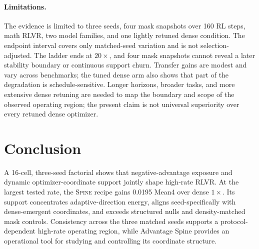 \documentclass[5p,times]{elsarticle}
\newcommand{\recipe}{\textsc{Spine}}
\begin{document}
\paragraph{Limitations.}
The evidence is limited to three seeds, four mask snapshots over 160 RL steps,
math RLVR, two model families, and one lightly retuned dense condition. The
endpoint interval covers only matched-seed variation and is not
selection-adjusted. The ladder ends at $20\times$, and four mask snapshots
cannot reveal a later stability boundary or continuous
support churn. Transfer gains are modest and vary across benchmarks; the tuned
dense arm also shows that part of the degradation is schedule-sensitive.
Longer horizons, broader tasks, and more extensive dense retuning are needed to
map the boundary and scope of the observed operating region; the present claim
is not universal superiority over every retuned dense optimizer.

\section{Conclusion}
A 16-cell, three-seed factorial shows that negative-advantage exposure and
dynamic optimizer-coordinate support jointly shape high-rate RLVR. At the
largest tested rate, the \recipe{} recipe gains 0.0195 Mean4 over dense
$1\times$. Its support concentrates adaptive-direction energy, aligns
seed-specifically with dense-emergent coordinates, and exceeds structured
nulls and density-matched mask controls. Consistency across the three matched
seeds supports a protocol-dependent high-rate operating region, while
Advantage Spine provides an operational tool for studying and controlling its
coordinate structure.

\appendix
\end{document}

